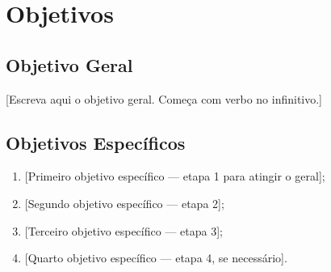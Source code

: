 
\section{Objetivos}

\subsection{Objetivo Geral}

%

[Escreva aqui o objetivo geral. Começa com verbo no infinitivo.]


\subsection{Objetivos Específicos}

%

\begin{enumerate}
    \item {[Primeiro objetivo específico — etapa 1 para atingir o geral]};
    \item {[Segundo objetivo específico — etapa 2]};
    \item {[Terceiro objetivo específico — etapa 3]};
    \item {[Quarto objetivo específico — etapa 4, se necessário]}.  
\end{enumerate}


